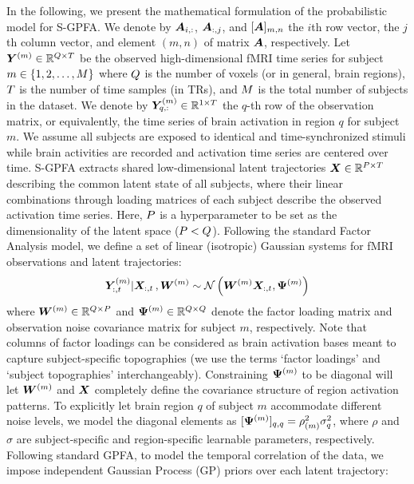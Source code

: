 \label{ch1:subsec:model}
In the following, we present the mathematical formulation of the probabilistic model for S-GPFA. We denote by $\bm{A}_{i,:}$, $\bm{A}_{:, j}$, and $[\bm{A}]_{m,n}$ the $i$th row vector, the $j$th column vector, and element $(m, n)$ of matrix $\bm{A}$, respectively. Let $\bm{Y}^{(m)} \in \mathbb{R}^{Q \times T}$ be the observed high-dimensional fMRI time series for subject $m \in \{1, 2, \ldots, M \}$ where $Q$ is the number of voxels (or in general, brain regions), $T$ is the number of time samples (in TRs), and $M$ is the total number of subjects in the dataset. We denote by $\bm{Y}^{(m)}_{q,:} \in \mathbb{R}^{1\times T}$ the $q$-th row of the observation matrix, or equivalently, the time series of brain activation in region $q$ for subject $m$. We assume all subjects are exposed to identical and time-synchronized stimuli while brain activities are recorded and activation time series are centered over time.
S-GPFA extracts shared low-dimensional latent trajectories $\bm{X} \in \mathbb{R}^{P \times T}$ describing the common latent state of all subjects, where their linear combinations through loading matrices of each subject describe the observed activation time series.
Here, $P$ is a hyperparameter to be set as the dimensionality of the latent space ($P < Q$). 
Following the standard Factor Analysis model, we define a set of linear (isotropic) Gaussian systems for fMRI observations and latent trajectories:
\begin{equation}
    \bm{Y}^{(m)}_{:, t} | \bm{X}_{:, t}\, , \bm{W}^{(m)} \sim \mathcal{N} \left( \bm{W}^{(m)} \bm{X}_{:, t}, \bm{\Psi}^{(m)} \right)
\end{equation}
where $\bm{W}^{(m)} \in \mathbb{R}^{Q \times P}$ and $\bm{\Psi}^{(m)} \in \mathbb{R}^{Q \times Q}$ denote the factor loading matrix and observation noise covariance matrix for subject $m$, respectively. Note that columns of factor loadings can be considered as brain activation bases meant to capture subject-specific topographies (we use the terms `factor loadings' and `subject topographies' interchangeably). Constraining $\bm{\Psi}^{(m)}$ to be diagonal will let $\bm{W}^{(m)}$ and $\bm{X}$ completely define the covariance structure of region activation patterns.
To explicitly let brain region $q$ of subject $m$ accommodate different noise levels, we model the diagonal elements as $[\bm{\Psi}^{(m)}]_{q, q} = \rho_{(m)}^2 \sigma_{q}^2$, where $\rho$ and $\sigma$ are subject-specific and region-specific learnable parameters, respectively. Following standard GPFA, to model the temporal correlation of the data, we impose independent Gaussian Process (GP) priors over each latent trajectory:
